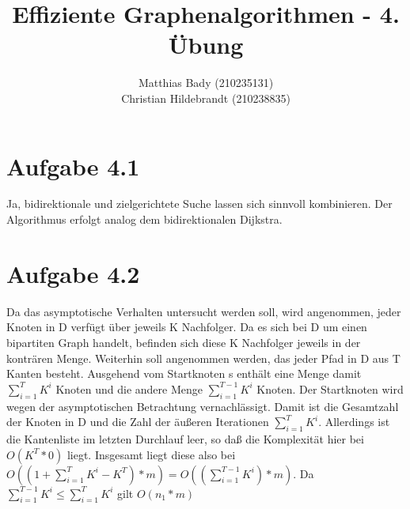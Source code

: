 \documentclass{scrartcl}
\title{Effiziente Graphenalgorithmen - 4. Übung}
\author{Matthias Bady (210235131)\\ Christian Hildebrandt (210238835)}
\begin{document}
\maketitle

\section{Aufgabe 4.1}
Ja, bidirektionale und zielgerichtete Suche lassen sich sinnvoll kombinieren. Der Algorithmus erfolgt analog dem bidirektionalen Dijkstra.

\section{Aufgabe 4.2}
Da das asymptotische Verhalten untersucht werden soll, wird angenommen, jeder Knoten in D verfügt über jeweils K Nachfolger. Da es sich bei D um einen bipartiten Graph handelt, befinden sich diese K Nachfolger jeweils in der konträren Menge. Weiterhin soll angenommen werden, das jeder Pfad in D aus T Kanten besteht. Ausgehend vom Startknoten s enthält eine Menge damit $\sum_{i=1}^{T}{K^i}$ Knoten und die andere Menge $\sum_{i=1}^{T-1}{K^i}$ Knoten. Der Startknoten wird wegen der asymptotischen Betrachtung vernachlässigt. Damit ist die Gesamtzahl der Knoten in D und die Zahl der äußeren Iterationen $\sum_{i=1}^{T}{K^i}$. Allerdings ist die Kantenliste im letzten Durchlauf leer, so daß die Komplexität hier bei $O(K^T*0)$ liegt. Insgesamt liegt diese also bei $O((1+\sum_{i=1}^{T}{K^i} - K^T)*m) = O((\sum_{i=1}^{T-1}{K^i})*m)$. Da $\sum_{i=1}^{T-1}{K^i} \leq \sum_{i=1}^{T}{K^i}$ gilt $O(n_1*m)$
\end{document}
